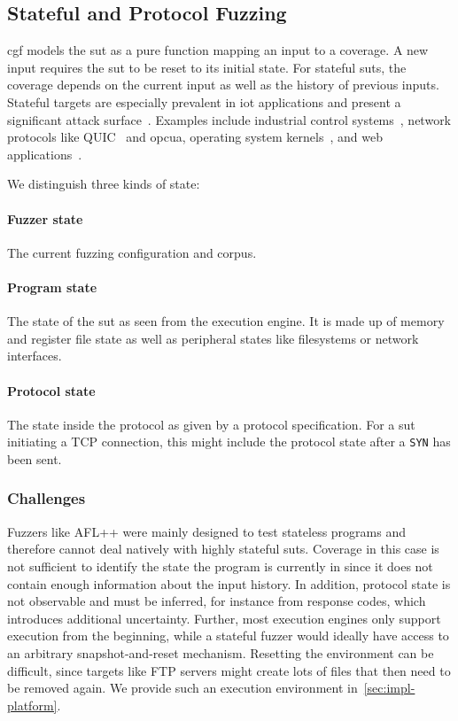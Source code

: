 \subsection{Stateful and Protocol Fuzzing}\label{sec:fuzzing-stateful}

\gls{cgf} models the \gls{sut} as a pure function mapping an input to a coverage.
A new input requires the \gls{sut} to be reset to its initial state.
For stateful \glspl{sut}, the coverage depends on the current input as well as the
history of previous inputs.
Stateful targets are especially prevalent in \gls{iot} applications and present a
significant attack surface~\cite{zhang_iot_2014,sadeghi_security_2015}.
Examples include industrial control systems~\cite{borcherding_bandits_2023},
network protocols like QUIC~\cite{ang_quic-fuzz_2025} and \gls{opcua},
operating system kernels~\cite{wang_syzvegas_2021}, and web applications~\cite{doupe_enemy_2012}.

We distinguish three kinds of state:

\paragraph{Fuzzer state}
The current fuzzing configuration and corpus.

\paragraph{Program state}
The state of the \gls{sut} as seen from the execution engine. It is made up
of memory and register file state as well as peripheral states like filesystems or network interfaces.

\paragraph{Protocol state}
The state inside the protocol as given by a protocol specification. For a \gls{sut} initiating
a TCP connection, this might include the protocol state after a \texttt{SYN} has been sent.

\subsubsection{Challenges}

Fuzzers like AFL++ were mainly designed to test stateless programs and
therefore cannot deal natively with highly stateful \glspl{sut}.
Coverage in this case is not sufficient to identify the state the program is currently
in since it does not contain enough information about the input history.
In addition, protocol state is not observable and must be inferred, for instance from response codes,
which introduces additional uncertainty.
Further, most execution engines only support execution from the beginning, while
a stateful fuzzer would ideally have access to an arbitrary snapshot-and-reset
mechanism.
Resetting the environment can be difficult, since targets like FTP servers
might create lots of files that then need to be removed again.
We provide such an execution environment in~\cref{sec:impl-platform}.

